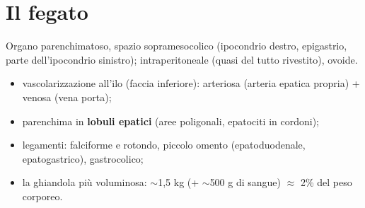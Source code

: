 \section{Il fegato}

Organo parenchimatoso, spazio sopramesocolico (ipocondrio destro, epigastrio, parte dell'ipocondrio
sinistro); intraperitoneale (quasi del tutto rivestito), ovoide.
\begin{itemize}
  \item vascolarizzazione all'ilo (faccia inferiore): arteriosa (arteria epatica propria) + venosa
    (vena porta);
  \item parenchima in \textbf{lobuli epatici} (aree poligonali, epatociti in cordoni);
  \item legamenti: falciforme e rotondo, piccolo omento (epatoduodenale, epatogastrico), gastrocolico;
  \item la ghiandola più voluminosa: $\sim$1,5 kg (+ $\sim$500 g di sangue) $\approx$ 2\% del peso
    corporeo.
\end{itemize}


